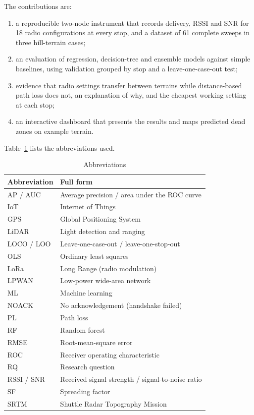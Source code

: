 \documentclass[conference]{IEEEtran}
\begin{document}
The contributions are:
\begin{enumerate}
    \item a reproducible two-node instrument that records delivery, RSSI and SNR for 18 radio configurations at every stop, and a dataset of 61 complete sweeps in three hill-terrain cases;
    \item an evaluation of regression, decision-tree and ensemble models against simple baselines, using validation grouped by stop and a leave-one-case-out test;
    \item evidence that radio settings transfer between terrains while distance-based path loss does not, an explanation of why, and the cheapest working setting at each stop;
    \item an interactive dashboard that presents the results and maps predicted dead zones on example terrain.
\end{enumerate}
Table~\ref{tab:abbr} lists the abbreviations used.

\begin{table}[t]
\caption{Abbreviations}\label{tab:abbr}
\centering
\footnotesize
\setlength{\tabcolsep}{4pt}
\begin{tabular}{@{}ll@{}}
\toprule
Abbreviation & Full form \\
\midrule
AP / AUC & Average precision / area under the ROC curve \\
IoT & Internet of Things \\
GPS & Global Positioning System \\
LiDAR & Light detection and ranging \\
LOCO / LOO & Leave-one-case-out / leave-one-stop-out \\
OLS & Ordinary least squares \\
LoRa & Long Range (radio modulation) \\
LPWAN & Low-power wide-area network \\
ML & Machine learning \\
NOACK & No acknowledgement (handshake failed) \\
PL & Path loss \\
RF & Random forest \\
RMSE & Root-mean-square error \\
ROC & Receiver operating characteristic \\
RQ & Research question \\
RSSI / SNR & Received signal strength / signal-to-noise ratio \\
SF & Spreading factor \\
SRTM & Shuttle Radar Topography Mission \\
\bottomrule
\end{tabular}
\end{table}
\end{document}
